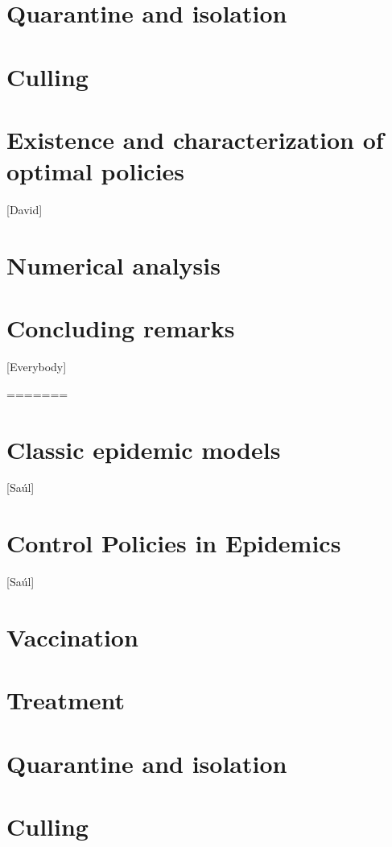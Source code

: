 \documentclass[a4paper]{amsart}
\begin{document}
      \section{Quarantine and isolation}
        
      \section{Culling}
        
  \section{Existence and characterization of optimal policies}
    [David]
  \section{Numerical analysis}
    
  \section{Concluding remarks}
    [Everybody]
%
  
  
=======
	\section{Classic epidemic models}
	[Saúl]
	\section{Control Policies in Epidemics}
	[Saúl]
    	
      \section{Vaccination}
      		
	    	
	    \section{Treatment}
	    	
	    	
	    \section{Quarantine and isolation}
	    	
	    \section{Culling}
	    	
\end{document}
